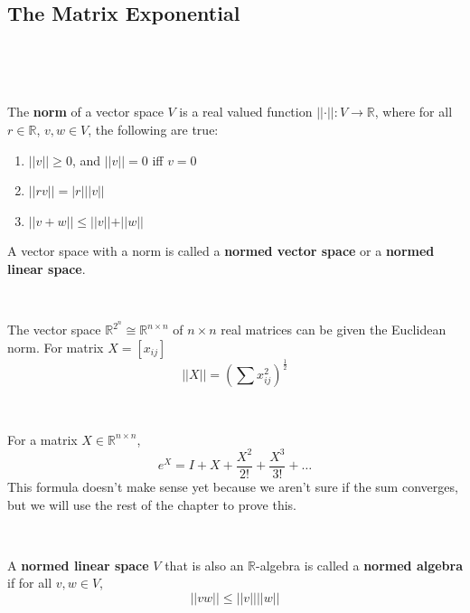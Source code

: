 \documentclass{article}
\begin{document}
\subsection{The Matrix Exponential}
\

\begin{definition}[Norm]
  \

  The \textbf{norm} of a vector space $V$ is a real valued function $\vert\vert \cdot\vert\vert : V \to \mathbb{R}$, where for all $r\in \mathbb{R}$, $v,w \in V$, the following are true:

  \begin{enumerate}
    \item $\vert\vert v\vert\vert \geq 0$, and $\vert\vert v\vert\vert = 0$ iff $v = 0$
    \item $\vert\vert rv\vert\vert = \vert r\vert \vert\vert v\vert\vert$
    \item$ \vert\vert v+w \vert\vert \leq \vert\vert v\vert\vert + \vert\vert w\vert\vert$
  \end{enumerate}

  A vector space with a norm is called a \textbf{normed vector space} or a \textbf{normed linear space}.
\end{definition}

\begin{example}
  \

  The vector space $\mathbb{R}^{2^n} \cong \mathbb{R}^{n \times n}$ of $n \times n$ real matrices can be given the Euclidean norm. For matrix $X = [x_{ij}]$ $$\vert\vert X\vert\vert = (\sum x_{ij}^2)^\frac{1}{2} $$
\end{example}

\begin{definition}
  \

  For a matrix $X \in \mathbb{R}^{n \times n}$, $$e^X = I + X + \frac{X^2}{2!} + \frac{X^3}{3!} + \dots$$This formula doesn't make sense yet because we aren't sure if the sum converges, but we will use the rest of the chapter to prove this.
\end{definition}

\begin{definition}
  \

  A \textbf{normed linear space} $V$ that is also an $\mathbb{R}$-algebra is called a \textbf{normed algebra} if for all $v, w \in V$, $$\vert\vert vw\vert\vert \leq \vert\vert v\vert\vert \vert\vert w\vert\vert  $$
\end{definition}
\end{document}
